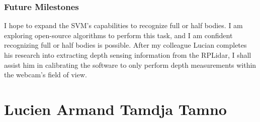 \documentclass[onecolumn, draftclsnofoot,10pt, compsoc]{IEEEtran}
\begin{document}
\begin{singlespace}
		\subsubsection{Future Milestones}
			I hope to expand the SVM's capabilities to recognize full or half bodies.
			I am exploring open-source algorithms to perform this task, and I am confident recognizing full or half bodies is possible.
			After my colleague Lucian completes his research into extracting depth sensing information from the RPLidar, I shall assist him in calibrating the software to only perform depth measurements within the webcam's field of view.


	\section{Lucien Armand Tamdja Tamno}
\end{singlespace}
\end{document}
